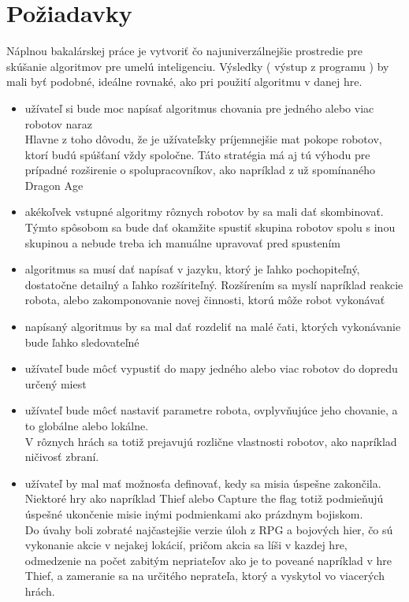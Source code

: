 \section{ Požiadavky }
Náplnou bakalárskej práce je vytvoriť čo najuniverzálnejšie prostredie pre skúšanie algoritmov pre umelú inteligenciu. Výsledky ( výstup z programu ) by mali byť podobné, ideálne rovnaké, ako  pri použití algoritmu v danej hre.
\begin {itemize}
\item užívateľ si bude moc napísať algoritmus chovania pre jedného alebo viac robotov naraz \\
	Hlavne z toho dôvodu, že je užívateľsky príjemnejšie mat pokope robotov, ktorí budú spúšťaní vždy spoločne. Táto stratégia má aj tú výhodu pre prípadné rozširenie o spolupracovníkov, ako napríklad z už spomínaného Dragon Age
\item akékoľvek vstupné algoritmy rôznych robotov by sa mali dať skombinovať.
	\\Týmto spôsobom sa bude dať okamžite spustiť skupina robotov spolu s inou skupinou a nebude treba ich manuálne upravovať pred spustením
\item algoritmus sa musí dať napísať v jazyku, ktorý je ľahko pochopiteľný, dostatočne detailný a ľahko rozšíriteľný.
	Rozšírením sa myslí napríklad reakcie robota, alebo zakomponovanie novej činnosti, ktorú môže robot vykonávať
\item napísaný algoritmus by sa mal dať rozdeliť na malé čati, ktorých vykonávanie bude ľahko sledovateľné
\item užívateľ bude môcť vypustiť do mapy jedného alebo viac robotov do dopredu určený miest
\item užívateľ bude môcť nastaviť parametre robota, ovplyvňujúce jeho chovanie, a to globálne alebo lokálne. \\
	V rôznych hrách sa totiž prejavujú rozlične vlastnosti robotov, ako napríklad ničivosť zbraní.
\item užívateľ by mal mať možnosťa definovať, kedy sa misia úspešne zakončila. \\
	Niektoré hry ako napríklad Thief alebo Capture the flag totiž podmieňujú úspešné ukončenie misie inými podmienkami ako prázdnym bojiskom.\\
	Do úvahy boli zobraté najčastejšie verzie úloh z RPG a bojových hier, čo sú vykonanie akcie v nejakej lokácií, pričom akcia sa líši v kazdej hre, odmedzenie na počet zabitým nepriateľov ako je to poveané napríklad v hre Thief, a zameranie sa na určitého neprateľa, ktorý a vyskytol vo viacerých hrách.

\end{itemize}
